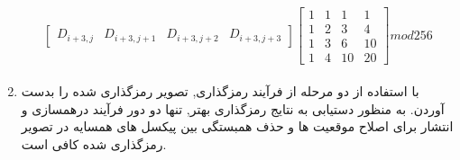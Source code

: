 \documentclass[xcolor=dvipsnames, professionalfonts, 11pt]{beamer}
\begin{document}
\begin{frame}[allowframebreaks]
\begin{enumerate}
{\begin{align}
\begin{split}
\begin{bmatrix}
                D_{i+3,j} & D_{i+3,j+1} & D_{i+3,j+2} & D_{i+3,j+3}
            \end{bmatrix}
            \begin{bmatrix}
                1 & 1 & 1 & 1\\
                1 & 2 & 3 & 4\\
                1 & 3 & 6 & 10\\
                1 & 4 & 10 & 20
            \end{bmatrix} mod 256
        \end{split}
    \end{align}
    }
    \item با استفاده از دو مرحله از فرآیند رمزگذاری, تصویر رمزگذاری شده  را بدست آوردن. به منظور دستیابی به نتایج رمزگذاری بهتر, تنها دو دور فرآیند درهمسازی و انتشار برای اصلاح موقعیت ها و حذف همبستگی بین پیکسل های همسایه در تصویر رمزگذاری شده کافی است.
\end{enumerate}
\end{frame}
\end{document}
